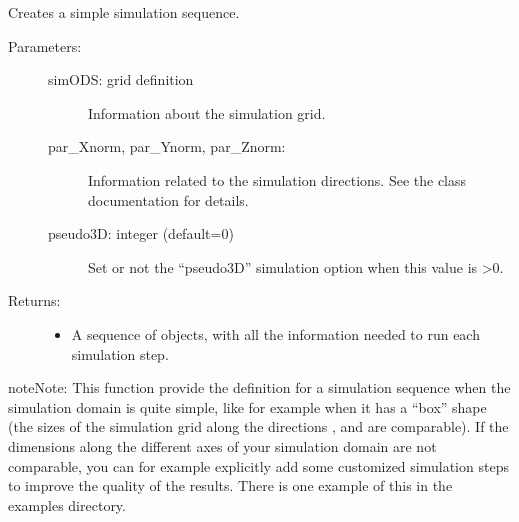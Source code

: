 \documentclass[letterpaper,10pt,english]{sphinxmanual}
\begin{document}

\begin{fulllineitems}
\label{\detokenize{appendices:s2Dcd.s2Dcd.create_seq}}
Creates a simple simulation sequence.
\begin{description}
\item[{Parameters:}] \leavevmode\begin{description}
\item[{simODS: grid definition}] \leavevmode
Information about the simulation grid.

\item[{par\_Xnorm, par\_Ynorm, par\_Znorm: }] \leavevmode
Information related to the simulation directions.
See the class documentation for details.

\item[{pseudo3D: integer (default=0)}] \leavevmode
Set or not the “pseudo3D” simulation option when this
value is \textgreater{}0.

\end{description}

\item[{Returns:}] \leavevmode\begin{itemize}
\item {} 
A sequence of {\hyperref[\detokenize{appendices:s2Dcd.s2Dcd.SeqStep}]{}} objects, with all the
information needed to run each simulation step.

\end{itemize}

\end{description}

\begin{sphinxadmonition}{note}{Note:}
This function provide the  definition for a
simulation sequence when the simulation domain is quite
simple, like for example when it has a “box” shape (the sizes
of the simulation grid along the directions ,  and 
are comparable).  If the dimensions along the different axes
of your simulation domain are not comparable, you can for
example explicitly add some customized simulation steps to
improve the quality of the results. There is one example of
this in the examples directory.
\end{sphinxadmonition}

\end{fulllineitems}
\end{document}
